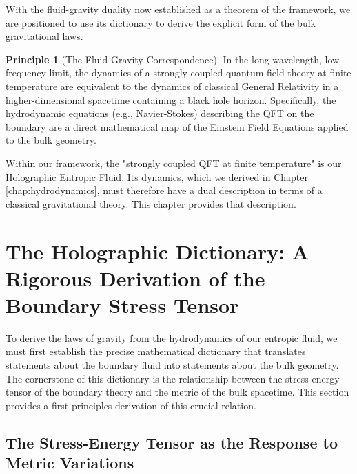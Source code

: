 \documentclass[11pt, letterpaper]{report}
\theoremstyle{plain} %
\theoremstyle{definition} %
\newtheorem{principle}{Principle}[chapter]
\theoremstyle{remark} %
\begin{document}
With the fluid-gravity duality now established as a theorem of the framework, we are positioned to use its dictionary to derive the explicit form of the bulk gravitational laws.















\begin{principle}[The Fluid-Gravity Correspondence]
In the long-wavelength, low-frequency limit, the dynamics of a strongly coupled quantum field theory at finite temperature are equivalent to the dynamics of classical General Relativity in a higher-dimensional spacetime containing a black hole horizon. Specifically, the hydrodynamic equations (e.g., Navier-Stokes) describing the QFT on the boundary are a direct mathematical map of the Einstein Field Equations applied to the bulk geometry.
\end{principle}

Within our framework, the "strongly coupled QFT at finite temperature" is our Holographic Entropic Fluid. Its dynamics, which we derived in Chapter \ref{chap:hydrodynamics}, must therefore have a dual description in terms of a classical gravitational theory. This chapter provides that description.




\section{The Holographic Dictionary: A Rigorous Derivation of the Boundary Stress Tensor}
\label{sec:holographic_dictionary_derivation}

To derive the laws of gravity from the hydrodynamics of our entropic fluid, we must first establish the precise mathematical dictionary that translates statements about the boundary fluid into statements about the bulk geometry. The cornerstone of this dictionary is the relationship between the stress-energy tensor of the boundary theory and the metric of the bulk spacetime. This section provides a first-principles derivation of this crucial relation.

\subsection{The Stress-Energy Tensor as the Response to Metric Variations}
\end{document}
